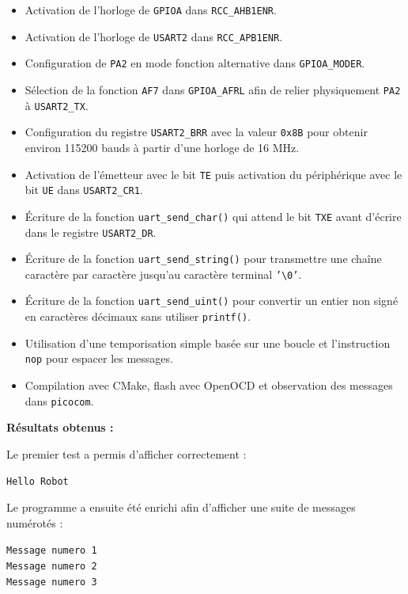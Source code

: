 \documentclass[11pt,a4paper]{article}
\begin{document}
\begin{sessionbox}
		\begin{itemize}
			\item Activation de l'horloge de \texttt{GPIOA} dans \texttt{RCC\_AHB1ENR}.
			\item Activation de l'horloge de \texttt{USART2} dans \texttt{RCC\_APB1ENR}.
			\item Configuration de \texttt{PA2} en mode fonction alternative dans \texttt{GPIOA\_MODER}.
			\item Sélection de la fonction \texttt{AF7} dans \texttt{GPIOA\_AFRL} afin de relier physiquement \texttt{PA2} à \texttt{USART2\_TX}.
			\item Configuration du registre \texttt{USART2\_BRR} avec la valeur \texttt{0x8B} pour obtenir environ 115200 bauds à partir d'une horloge de 16 MHz.
			\item Activation de l'émetteur avec le bit \texttt{TE} puis activation du périphérique avec le bit \texttt{UE} dans \texttt{USART2\_CR1}.
			\item Écriture de la fonction \texttt{uart\_send\_char()} qui attend le bit \texttt{TXE} avant d'écrire dans le registre \texttt{USART2\_DR}.
			\item Écriture de la fonction \texttt{uart\_send\_string()} pour transmettre une chaîne caractère par caractère jusqu'au caractère terminal \texttt{'\textbackslash 0'}.
			\item Écriture de la fonction \texttt{uart\_send\_uint()} pour convertir un entier non signé en caractères décimaux sans utiliser \texttt{printf()}.
			\item Utilisation d'une temporisation simple basée sur une boucle et l'instruction \texttt{nop} pour espacer les messages.
			\item Compilation avec CMake, flash avec OpenOCD et observation des messages dans \texttt{picocom}.
		\end{itemize}
		
		\vspace{0.3cm}
		
		\textbf{Résultats obtenus :}
		
		Le premier test a permis d'afficher correctement :
		
		\begin{center}
			\texttt{Hello Robot}
		\end{center}
		
		Le programme a ensuite été enrichi afin d'afficher une suite de messages numérotés :
		
		\begin{center}
			\texttt{Message numero 1}\\
			\texttt{Message numero 2}\\
			\texttt{Message numero 3}
		\end{center}
		

\end{sessionbox}
\end{document}
